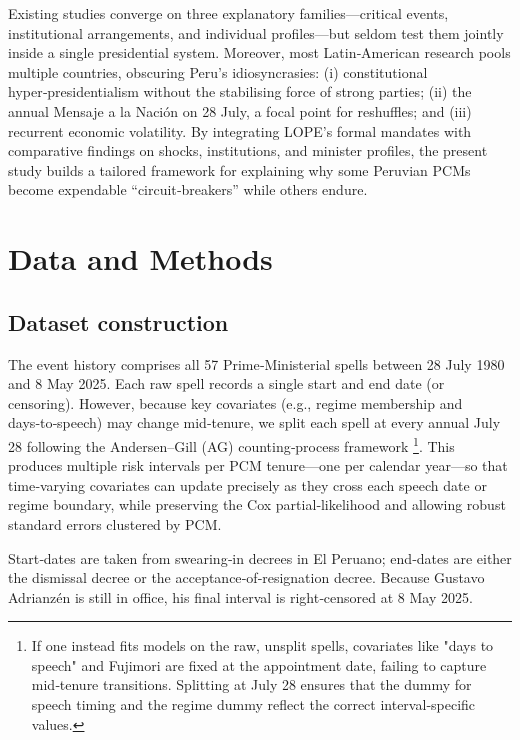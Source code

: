 \documentclass[a4paper, 12pt]{article}
\begin{document}
Existing studies converge on three explanatory families—critical events, institutional arrangements, and individual profiles—but seldom test them jointly inside a single presidential system.  Moreover, most Latin‑American research pools multiple countries, obscuring Peru’s idiosyncrasies: (i) constitutional hyper‑presidentialism without the stabilising force of strong parties; (ii) the annual Mensaje a la Nación on 28 July, a focal point for reshuffles; and (iii) recurrent economic volatility.  By integrating LOPE’s formal mandates with comparative findings on shocks, institutions, and minister profiles, the present study builds a tailored framework for explaining why some Peruvian PCMs become expendable “circuit‑breakers” while others endure.



\section{Data and Methods}

\subsection{Dataset construction}

The event history comprises all 57 Prime‑Ministerial spells between 28 July 1980 and 8 May 2025. Each raw spell records a single start and end date (or censoring).  However, because key covariates (e.g., regime membership and days‑to‑speech) may change mid‑tenure, we split each spell at every annual July 28 following the Andersen–Gill (AG) counting‑process framework \footnote{If one instead fits models on the raw, unsplit spells, covariates like "days to speech" and Fujimori are fixed at the appointment date, failing to capture mid‑tenure transitions.  Splitting at July 28 ensures that the  dummy for speech timing and the regime dummy reflect the correct interval‑specific values.}.  This produces multiple risk intervals per PCM tenure—one per calendar year—so that time‑varying covariates can update precisely as they cross each speech date or regime boundary, while preserving the Cox partial‑likelihood and allowing robust standard errors clustered by PCM.

Start‑dates are taken from swearing‑in decrees in El Peruano; end‑dates are either the dismissal decree or the acceptance‑of‑resignation decree. Because Gustavo Adrianzén is still in office, his final interval is right‑censored at 8 May 2025.
\end{document}
